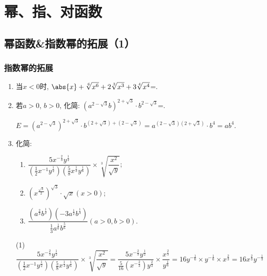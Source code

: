 \setcounter{page}{1}
\chapter*{幂、指、对函数} %

\section{幂函数\&指数幂的拓展（1）}
\subsection{指数幂的拓展}

\begin{enumerate}
\item 当$x<0$时, $\abs{x}+\sqrt[6]{x^6}+2\sqrt[3]{x^3}+3\sqrt[4]{x^4}$=. 

\item 若$a>0$, $b>0$, 化简: $\left(a^{2-\sqrt{3}}b\right)^{2+\sqrt{3}}\cdot b^{2-\sqrt{3}}$=. 
\begin{jieda}
$E=(a^{2-\sqrt{3}})^{2+\sqrt{3}}\cdot b^{(2+\sqrt{3})+(2-\sqrt{3})}=a^{(2-\sqrt{3})(2+\sqrt{3})}\cdot b^4=ab^4$. 
\end{jieda}

\item 化简:
\begin{enumerate}
\item $\dfrac{5x^{-\frac{2}{3}}y^{\frac{1}{2}}}{\left(\frac{1}{2}x^{-1}y^{\frac{1}{2}}\right)\left(\frac{5}{8}x^{\frac{1}{3}}y^{\frac{1}{6}}\right)}
\times \sqrt[3]{\dfrac{x^2}{\sqrt{y}}}$; 

\item $\left(x^{\frac{\sqrt{3}}{2}}\right)^{\sqrt{3}}\cdot\sqrt{x}(x>0)$; 

\item $\dfrac{\left(a^{\frac{2}{3}}b^{\frac{1}{2}}\right)\left(-3a^{\frac{1}{2}}b^{\frac{1}{3}}\right)}{\frac{1}{3}a^{\frac{1}{6}}b^{\frac{5}{6}}}(a>0,b>0)$.
\end{enumerate}
\begin{jieda}
(1) $\dfrac{5x^{-\frac{2}{3}}y^{\frac{1}{2}}}{\left(\frac{1}{2}x^{-1}y^{\frac{1}{2}}\right)\left(\frac{5}{8}x^{\frac{1}{3}}y^{\frac{1}{6}}\right)}
\times \sqrt[3]{\dfrac{x^2}{\sqrt{y}}} = \dfrac{5x^{-\frac{2}{3}}y^{\frac{1}{2}}}{\frac{5}{16}(x^{-\frac{2}{3}})y^{\frac{2}{3}}} \times \dfrac{x^{\frac{2}{3}}}{y^{\frac{1}{6}}} = 16y^{-\frac{1}{6}} \times y^{-\frac{1}{6}} \times x^{\frac{2}{3}} = 16x^{\frac{2}{3}}y^{-\frac{1}{3}}$


\end{jieda}
\end{enumerate}
